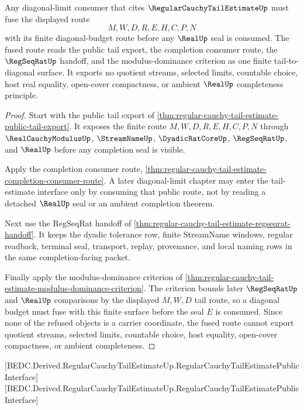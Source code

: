 \begin{theorem}
\label{thm:regular-cauchy-tail-estimate-diagonal-tail-fusion}
Any diagonal-limit consumer that cites $\RegularCauchyTailEstimateUp$ must
fuse the displayed route
$$
M,W,D,R,E,H,C,P,N
$$
with its finite diagonal-budget route before any $\RealUp$ seal is consumed.
The fused route reads the public tail export, the completion consumer route,
the $\RegSeqRatUp$ handoff, and the modulus-dominance criterion as one finite
tail-to-diagonal surface. It exports no quotient streams, selected limits,
countable choice, host real equality, open-cover compactness, or ambient
$\RealUp$ completeness principle.
\end{theorem}
\begin{proof}
Start with the public tail export of
\autoref{thm:regular-cauchy-tail-estimate-public-tail-export}. It exposes the
finite route $M,W,D,R,E,H,C,P,N$ through $\RealCauchyModulusUp$,
$\StreamNameUp$, $\DyadicRatCoreUp$, $\RegSeqRatUp$, and $\RealUp$ before any
completion seal is visible.

Apply the completion consumer route,
\autoref{thm:regular-cauchy-tail-estimate-completion-consumer-route}. A later
diagonal-limit chapter may enter the tail-estimate interface only by consuming
that public route, not by reading a detached $\RealUp$ seal or an ambient
completion theorem.

Next use the RegSeqRat handoff of
\autoref{thm:regular-cauchy-tail-estimate-regseqrat-handoff}. It keeps the
dyadic tolerance row, finite StreamName windows, regular readback, terminal
seal, transport, replay, provenance, and local naming rows in the same
completion-facing packet.

Finally apply the modulus-dominance criterion of
\autoref{thm:regular-cauchy-tail-estimate-modulus-dominance-criterion}. The
criterion bounds later $\RegSeqRatUp$ and $\RealUp$ comparisons by the
displayed $M,W,D$ tail route, so a diagonal budget must fuse with this finite
surface before the seal $E$ is consumed. Since none of the refused objects is a
carrier coordinate, the fused route cannot export quotient streams, selected
limits, countable choice, host equality, open-cover compactness, or ambient
completeness.
\end{proof}

[BEDC.Derived.RegularCauchyTailEstimateUp.RegularCauchyTailEstimatePublicInterface]
[BEDC.Derived.RegularCauchyTailEstimateUp.RegularCauchyTailEstimatePublicInterface]

